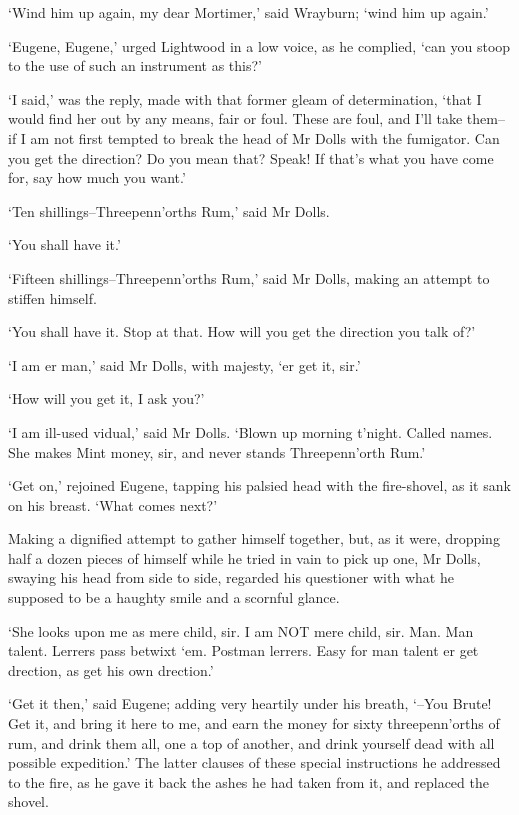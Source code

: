‘Wind him up again, my dear Mortimer,’ said Wrayburn; ‘wind him up
again.’

‘Eugene, Eugene,’ urged Lightwood in a low voice, as he complied, ‘can
you stoop to the use of such an instrument as this?’

‘I said,’ was the reply, made with that former gleam of determination,
‘that I would find her out by any means, fair or foul. These are foul,
and I’ll take them--if I am not first tempted to break the head of Mr
Dolls with the fumigator. Can you get the direction? Do you mean that?
Speak! If that’s what you have come for, say how much you want.’

‘Ten shillings--Threepenn’orths Rum,’ said Mr Dolls.

‘You shall have it.’

‘Fifteen shillings--Threepenn’orths Rum,’ said Mr Dolls, making an
attempt to stiffen himself.

‘You shall have it. Stop at that. How will you get the direction you
talk of?’

‘I am er man,’ said Mr Dolls, with majesty, ‘er get it, sir.’

‘How will you get it, I ask you?’

‘I am ill-used vidual,’ said Mr Dolls. ‘Blown up morning t’night. Called
names. She makes Mint money, sir, and never stands Threepenn’orth Rum.’

‘Get on,’ rejoined Eugene, tapping his palsied head with the
fire-shovel, as it sank on his breast. ‘What comes next?’

Making a dignified attempt to gather himself together, but, as it were,
dropping half a dozen pieces of himself while he tried in vain to pick
up one, Mr Dolls, swaying his head from side to side, regarded his
questioner with what he supposed to be a haughty smile and a scornful
glance.

‘She looks upon me as mere child, sir. I am NOT mere child, sir. Man.
Man talent. Lerrers pass betwixt ‘em. Postman lerrers. Easy for man
talent er get drection, as get his own drection.’

‘Get it then,’ said Eugene; adding very heartily under his breath,
‘--You Brute! Get it, and bring it here to me, and earn the money for
sixty threepenn’orths of rum, and drink them all, one a top of another,
and drink yourself dead with all possible expedition.’ The latter
clauses of these special instructions he addressed to the fire, as he
gave it back the ashes he had taken from it, and replaced the shovel.

